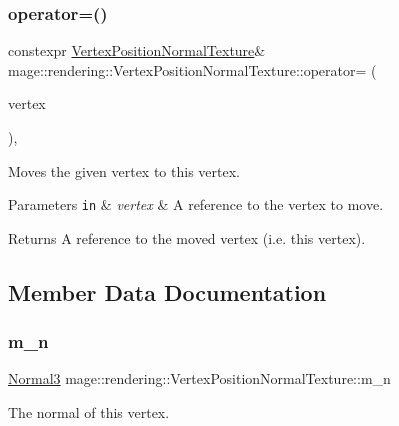 \subsubsection{\texorpdfstring{operator=()}{operator=()}\hspace{0.1cm}{\footnotesize\ttfamily [2/2]}}
{\footnotesize\ttfamily constexpr \hyperlink{structmage_1_1rendering_1_1_vertex_position_normal_texture}{Vertex\+Position\+Normal\+Texture}\& mage\+::rendering\+::\+Vertex\+Position\+Normal\+Texture\+::operator= (\begin{DoxyParamCaption}\item[{\hyperlink{structmage_1_1rendering_1_1_vertex_position_normal_texture}{Vertex\+Position\+Normal\+Texture} \&\&}]{vertex }\end{DoxyParamCaption})\hspace{0.3cm}{\ttfamily [default]}, {\ttfamily [noexcept]}}

Moves the given vertex to this vertex.


\begin{DoxyParams}[1]{Parameters}
\mbox{\tt in}  & {\em vertex} & A reference to the vertex to move. \\
\hline
\end{DoxyParams}
\begin{DoxyReturn}{Returns}
A reference to the moved vertex (i.\+e. this vertex). 
\end{DoxyReturn}


\subsection{Member Data Documentation}
\hypertarget{structmage_1_1rendering_1_1_vertex_position_normal_texture_a7c800b1234a9291361a21ce2289b1394}{}\label{structmage_1_1rendering_1_1_vertex_position_normal_texture_a7c800b1234a9291361a21ce2289b1394} 
\subsubsection{\texorpdfstring{m\+\_\+n}{m\_n}}
{\footnotesize\ttfamily \hyperlink{structmage_1_1_normal3}{Normal3} mage\+::rendering\+::\+Vertex\+Position\+Normal\+Texture\+::m\+\_\+n}

The normal of this vertex. \hypertarget{structmage_1_1rendering_1_1_vertex_position_normal_texture_a6e41b77f1a21c4eb9f49cf936c131aee}{}\label{structmage_1_1rendering_1_1_vertex_position_normal_texture_a6e41b77f1a21c4eb9f49cf936c131aee} 
